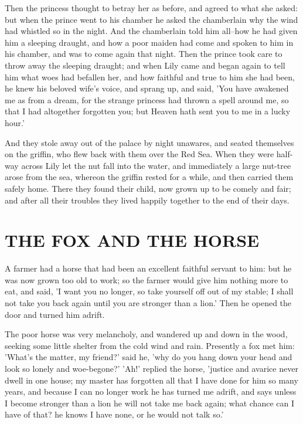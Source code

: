 \documentclass[12pt]{book}
\begin{document}
Then the princess thought to betray her as before, and agreed to what
she asked: but when the prince went to his chamber he asked the
chamberlain why the wind had whistled so in the night. And the
chamberlain told him all--how he had given him a sleeping draught, and
how a poor maiden had come and spoken to him in his chamber, and was
to come again that night. Then the prince took care to throw away the
sleeping draught; and when Lily came and began again to tell him what
woes had befallen her, and how faithful and true to him she had been,
he knew his beloved wife's voice, and sprang up, and said, 'You have
awakened me as from a dream, for the strange princess had thrown a
spell around me, so that I had altogether forgotten you; but Heaven
hath sent you to me in a lucky hour.'

And they stole away out of the palace by night unawares, and seated
themselves on the griffin, who flew back with them over the Red Sea.
When they were half-way across Lily let the nut fall into the water,
and immediately a large nut-tree arose from the sea, whereon the
griffin rested for a while, and then carried them safely home. There
they found their child, now grown up to be comely and fair; and after
all their troubles they lived happily together to the end of their
days.



\chapter{THE FOX AND THE HORSE}

A farmer had a horse that had been an excellent faithful servant to
him: but he was now grown too old to work; so the farmer would give
him nothing more to eat, and said, 'I want you no longer, so take
yourself off out of my stable; I shall not take you back again until
you are stronger than a lion.' Then he opened the door and turned him
adrift.

The poor horse was very melancholy, and wandered up and down in the
wood, seeking some little shelter from the cold wind and rain.
Presently a fox met him: 'What's the matter, my friend?' said he, 'why
do you hang down your head and look so lonely and woe-begone?' 'Ah!'
replied the horse, 'justice and avarice never dwell in one house; my
master has forgotten all that I have done for him so many years, and
because I can no longer work he has turned me adrift, and says unless
I become stronger than a lion he will not take me back again; what
chance can I have of that? he knows I have none, or he would not talk
so.'
\end{document}
